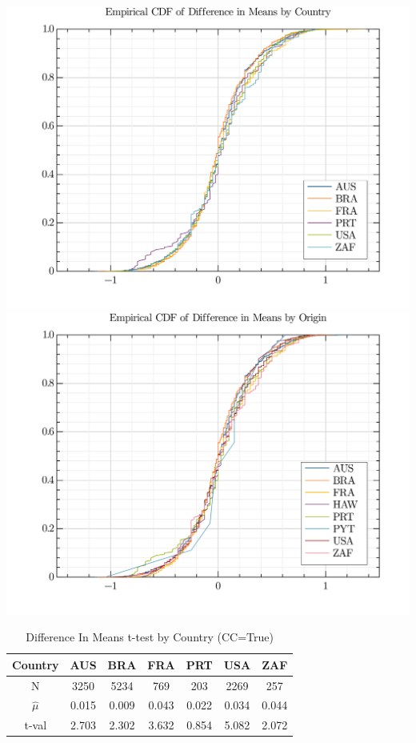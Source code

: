 \documentclass{article}
\begin{document}
\includegraphics[width=\textwidth]{./visuals/ttests/CCtrue/EmpDiffInMeansCDF.png}
\includegraphics[width=\textwidth]{./visuals/ttests/CCfalse/EmpDiffInMeansCDF.png}


\begin{table}
\caption{Difference In Means t-test by Country (CC=True)}
\label{DiffInMeansttestsCCtrue}
\begin{center} \begin{tabular}{|c|c|c|c|c|c|c|} \hline
Country & AUS & BRA & FRA & PRT & USA & ZAF  \\ \hline
N & 3250 & 5234 & 769 & 203 & 2269 & 257  \\ \hline
$\hat{\mu}$ & 0.015 & 0.009 & 0.043 & 0.022 & 0.034 & 0.044  \\ \hline
t-val  & 2.703 & 2.302 & 3.632 & 0.854 & 5.082 & 2.072  \\ \hline
\end{tabular} \end{center}
\end{table}
\end{document}
